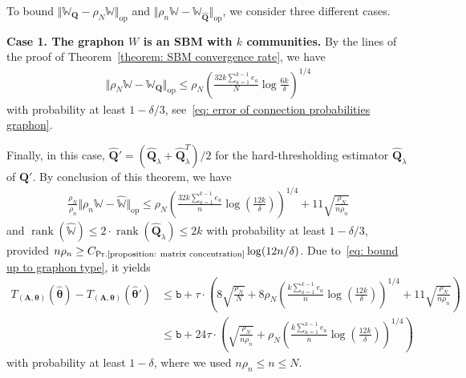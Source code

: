\documentclass[11pt]{article}
\newcommand{\op}{\mathrm{op}}
\newcommand{\bA}{\bm{A}}
\newcommand{\bQ}{\bm{Q}}
\newcommand{\btheta}{\bm{\theta}}
\newcommand{\bbW}{\mathbb{W}}
\newcommand{\constantBandeira}{C_{\text{Pr.\ref{proposition: matrix concentration}}}}
\newcommand{\<}{\langle}
\renewcommand{\>}{\rangle}
\newcommand{\ttb}{\mathtt{b}}
\DeclareMathOperator{\rank}{rank}
\theoremstyle{plain}
\theoremstyle{definition}
\theoremstyle{remark}
\begin{document}
{To bound $\Vert \bbW_{\bQ} - \rho_N \bbW \Vert_{\op}$ and $\Vert \rho_n \bbW - \bbW_{\widehat{\bQ}} \Vert_{\op}$, we consider three different cases.

\noindent \textbf{Case 1. The graphon $W$ is an SBM with $k$ communities.} By the lines of the proof of Theorem~\ref{theorem: SBM convergence rate}, we have
\begin{align*}
    \Vert \rho_N \bbW - \bbW_{\bQ} \Vert_{\op} \le \rho_N \left ( \frac{32k \sum_{a = 1}^{k - 1}e_a}{N} \log \frac{6k}{\delta} \right )^{1/4}
\end{align*}
with probability at least $1 - \delta/3$, see~\eqref{eq: error of connection probabilities graphon}. 

Finally, in this case, $\widehat{\bQ}' = (\widehat{\bQ}_{\lambda} + \widehat{\bQ}^T_{\lambda})/2$ for the hard-thresholding estimator $\widehat{\bQ}_{\lambda}$ of $\bQ'$. By conclusion of this theorem, we have
\begin{align*}
    \frac{\rho_N}{\rho_n} \Vert \rho_n \bbW - \widehat{\bbW} \Vert_{\op} \le \rho_N \left ( \frac{32k \sum_{a = 1}^{k - 1}e_a}{n} \log \left ( \frac{12k}{\delta} \right) \right )^{1/4} + 11 \sqrt{\frac{\rho_N}{n \rho_n}}
\end{align*}
and $\rank(\widehat{\bbW})  \le 2 \cdot \rank(\widehat{\bQ}_{\lambda}) \le 2 k$ with probability at least $1 - \delta/3$, provided $n \rho_n \ge \constantBandeira \log (12 n/\delta)$. Due to~\eqref{eq: bound up to graphon type}, it yields
\begin{align*}
    T_{(\bA, \btheta)}(\hat{\btheta}) - T_{(\bA, \btheta)}(\hat{\btheta}') & \le \ttb + \tau \cdot \left (8\sqrt{\frac{\rho_N}{N}}+ 8 \rho_N \left ( \frac{k \sum_{a = 1}^{k - 1}e_a}{n} \log \left ( \frac{12k}{\delta} \right) \right )^{1/4} +  11 \sqrt{\frac{\rho_N}{n \rho_n}}\right ) \\
    & \le \ttb + 24\tau \cdot \left (\sqrt{\frac{\rho_N}{n \rho_n}}+  \rho_N \left ( \frac{k \sum_{a = 1}^{k - 1}e_a}{n} \log \left ( \frac{12k}{\delta} \right) \right )^{1/4} \right )
\end{align*}
with probability at least $1 - \delta$,
where we used $n \rho_n \le n \le N$.

}
\end{document}
